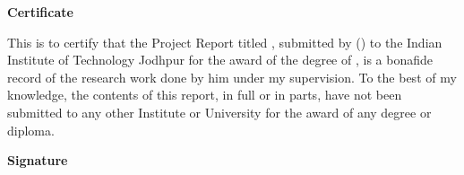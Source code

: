 \begin{flushright}
\huge{\textbf{Certificate}}
\end{flushright}
This is to certify that the Project Report titled \ttitle{}, submitted by \authorname{}(\rn{}) to the Indian Institute of Technology Jodhpur for the award of the degree of \degree{}, is a bonafide record of the research work done by him under my supervision. To the best of my knowledge, the contents of this report, in full or in parts, have not been submitted to any other Institute or University for the award of any degree or diploma.
\vspace{2cm}
\begin{flushright}
\large{\textbf{Signature}}\\
\supname\\
\end{flushright}